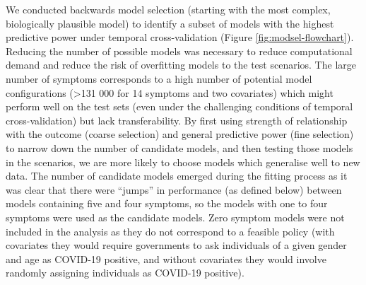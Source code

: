 \documentclass[]{elsarticle} %
\begin{document}
We conducted backwards model selection (starting with the most complex, biologically plausible model) to identify a subset of models with the highest predictive power under temporal cross-validation (Figure \ref{fig:modsel-flowchart}).
Reducing the number of possible models was necessary to reduce computational demand and reduce the risk of overfitting models to the test scenarios.
The large number of symptoms corresponds to a high number of potential model configurations (\textgreater131 000 for 14 symptoms and two covariates) which might perform well on the test sets (even under the challenging conditions of temporal cross-validation) but lack transferability.
By first using strength of relationship with the outcome (coarse selection) and general predictive power (fine selection) to narrow down the number of candidate models, and then testing those models in the scenarios, we are more likely to choose models which generalise well to new data.
The number of candidate models emerged during the fitting process as it was clear that there were ``jumps'' in performance (as defined below) between models containing five and four symptoms, so the models with one to four symptoms were used as the candidate models.
Zero symptom models were not included in the analysis as they do not correspond to a feasible policy (with covariates they would require governments to ask individuals of a given gender and age as COVID-19 positive, and without covariates they would involve randomly assigning individuals as COVID-19 positive).
\end{document}
